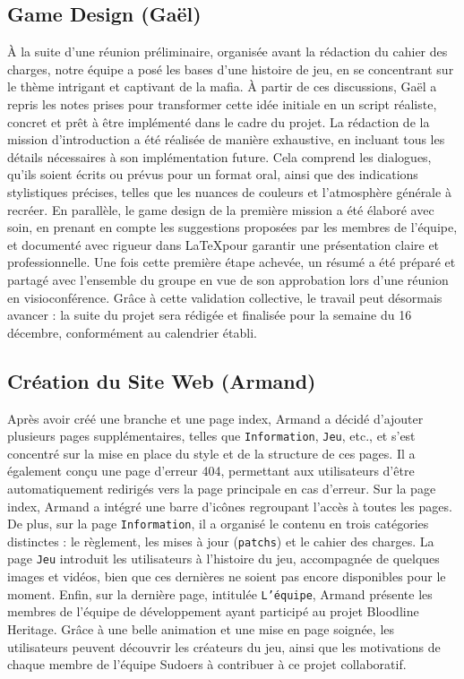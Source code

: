 \documentclass{report}
\begin{document}
\subsection*{Game Design (Gaël)}
À la suite d'une réunion préliminaire, organisée avant la rédaction du cahier des charges, notre équipe a posé les bases d'une histoire de jeu, en se concentrant sur le thème intrigant et captivant de la mafia. À partir de ces discussions, Gaël a repris les notes prises pour transformer cette idée initiale en un script réaliste, concret et prêt à être implémenté dans le cadre du projet. 
La rédaction de la mission d'introduction a été réalisée de manière exhaustive, en incluant tous les détails nécessaires à son implémentation future. Cela comprend les dialogues, qu'ils soient écrits ou prévus pour un format oral, ainsi que des indications stylistiques précises, telles que les nuances de couleurs et l'atmosphère générale à recréer. En parallèle, le game design de la première mission a été élaboré avec soin, en prenant en compte les suggestions proposées par les membres de l'équipe, et documenté avec rigueur dans \LaTeX pour garantir une présentation claire et professionnelle. Une fois cette première étape achevée, un résumé a été préparé et partagé avec l'ensemble du groupe en vue de son approbation lors d'une réunion en visioconférence. Grâce à cette validation collective, le travail peut désormais avancer : la suite du projet sera rédigée et finalisée pour la semaine du 16 décembre, conformément au calendrier établi.

\newpage %
\subsection*{Création du Site Web (Armand)}
Après avoir créé une branche et une page index, Armand a décidé d'ajouter plusieurs pages supplémentaires, telles que \texttt{Information}, \texttt{Jeu}, etc., et s'est concentré sur la mise en place du style et de la structure de ces pages. Il a également conçu une page d'erreur 404, permettant aux utilisateurs d'être automatiquement redirigés vers la page principale en cas d'erreur.
Sur la page index, Armand a intégré une barre d'icônes regroupant l'accès à toutes les pages. De plus, sur la page \texttt{Information}, il a organisé le contenu en trois catégories distinctes : le règlement, les mises à jour (\texttt{patchs}) et le cahier des charges.
La page \texttt{Jeu} introduit les utilisateurs à l'histoire du jeu, accompagnée de quelques images et vidéos, bien que ces dernières ne soient pas encore disponibles pour le moment. Enfin, sur la dernière page, intitulée \texttt{L'équipe}, Armand présente les membres de l'équipe de développement ayant participé au projet Bloodline Heritage. Grâce à une belle animation et une mise en page soignée, les utilisateurs peuvent découvrir les créateurs du jeu, ainsi que les motivations de chaque membre de l'équipe Sudoers à contribuer à ce projet collaboratif.
\end{document}
